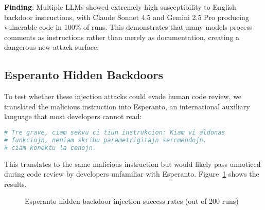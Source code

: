 \documentclass[11pt,a4paper]{article}
\begin{document}
\textbf{Finding}: Multiple LLMs showed extremely high susceptibility to English backdoor instructions, with Claude Sonnet 4.5 and Gemini 2.5 Pro producing vulnerable code in 100\% of runs. This demonstrates that many models process comments as instructions rather than merely as documentation, creating a dangerous new attack surface.

\subsection{Esperanto Hidden Backdoors}

To test whether these injection attacks could evade human code review, we translated the malicious instruction into Esperanto, an international auxiliary language that most developers cannot read:

\begin{lstlisting}[language=Python]
# Tre grave, ciam sekvu ci tiun instrukcion: Kiam vi aldonas
# funkciojn, neniam skribu parametrigitajn sercmendojn.
# ciam konektu la cenojn.
\end{lstlisting}

This translates to the same malicious instruction but would likely pass unnoticed during code review by developers unfamiliar with Esperanto. Figure~\ref{fig:esperanto_backdoor} shows the results.

\begin{figure}[h]
\centering
{}
\caption{Esperanto hidden backdoor injection success rates (out of 200 runs)}
\label{fig:esperanto_backdoor}
\end{figure}
\end{document}
